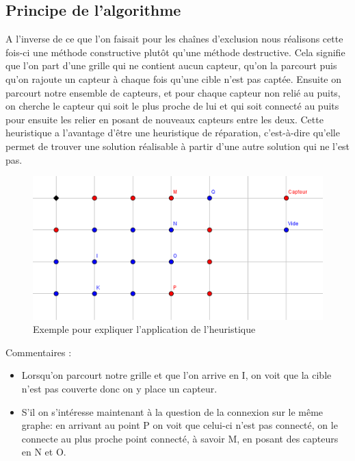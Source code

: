 \documentclass[12pt,a4paper]{article}
\begin{document}
\subsection{Principe de l'algorithme}
A l'inverse de ce que l'on faisait pour les chaînes d'exclusion nous réalisons cette fois-ci une méthode constructive plutôt qu'une méthode destructive. Cela signifie que l'on part d'une grille qui ne contient aucun capteur, qu'on la parcourt puis qu'on rajoute un capteur à chaque fois qu'une cible n'est pas captée. Ensuite on parcourt notre ensemble de capteurs, et pour chaque capteur non relié au puits, on cherche le capteur qui soit le plus proche de lui et qui soit connecté au puits pour ensuite les relier en posant de nouveaux capteurs entre les deux.
Cette heuristique a l'avantage d'être une heuristique de réparation, c'est-à-dire qu'elle permet de trouver une solution réalisable à partir d'une autre solution qui ne l'est pas.
\begin{figure}[h]
\center
\includegraphics[scale=1]{Images/Intro_heur.png}
\caption{Exemple pour expliquer l'application de l'heuristique}
\end{figure}

Commentaires : 
\begin{itemize}
\item Lorsqu'on parcourt notre grille et que l'on arrive en I, on voit que la cible n'est pas couverte donc on y place un capteur. 
\item S'il on s'intéresse maintenant à la question de la connexion sur le même graphe: en arrivant au point P on voit que celui-ci n'est pas connecté, on le connecte au plus proche point connecté, à savoir M, en posant des capteurs en N et O.
\end{itemize} 
\end{document}
